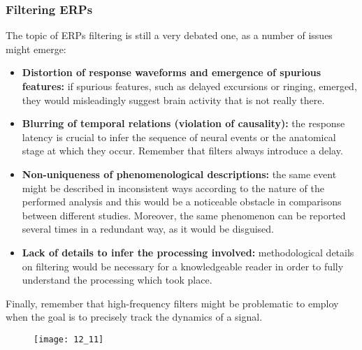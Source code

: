 \subsubsection{Filtering ERPs}
The topic of ERPs filtering is still a very debated one, as a number of issues might emerge:
\begin{itemize}
    \item \textbf{Distortion of response waveforms and emergence of spurious features:} if spurious
          features, such as delayed excursions or ringing, emerged, they would misleadingly
          suggest brain activity that is not really there.
    \item \textbf{Blurring of temporal relations (violation of causality):} the response latency is
          crucial to infer the sequence of neural events or the anatomical stage at which they
          occur. Remember that filters always introduce a delay.
    \item \textbf{Non-uniqueness of phenomenological descriptions:} the same event might be
          described in inconsistent ways according to the nature of the performed analysis and
          this would be a noticeable obstacle in comparisons between different studies. Moreover,
          the same phenomenon can be reported several times in a redundant way, as it would be
          disguised.
    \item \textbf{Lack of details to infer the processing involved:} methodological details
          on filtering would be necessary for a knowledgeable reader in order to fully understand
          the processing which took place.
\end{itemize}
Finally, remember that high-frequency filters might be problematic to employ when the goal is
to precisely track the dynamics of a signal.
\begin{figure}[H]
    \centering
    \texttt{[image: 12\_11]}
\end{figure}